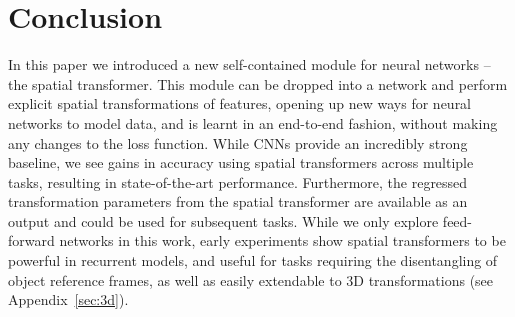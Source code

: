 \documentclass{article} %
\begin{document}
\section{Conclusion}
In this paper we introduced a new self-contained module for neural
networks -- the spatial transformer. This module can be dropped into a
network and perform explicit spatial transformations of features,
opening up new ways for neural networks to model data, and is learnt
in an end-to-end fashion, without making any changes to the loss
function. While CNNs provide an incredibly strong baseline, we see
gains in accuracy using spatial transformers across multiple tasks,
resulting in state-of-the-art performance.  Furthermore, the regressed
transformation parameters from the spatial transformer are available
as an output and could be used for subsequent tasks.  
While we only
explore feed-forward networks in this work, early experiments show
spatial transformers to be powerful in recurrent models, and useful
for tasks requiring the disentangling of object reference frames, as well as easily extendable to 3D transformations (see Appendix~\ref{sec:3d}). 


{
\small

}
\end{document}
